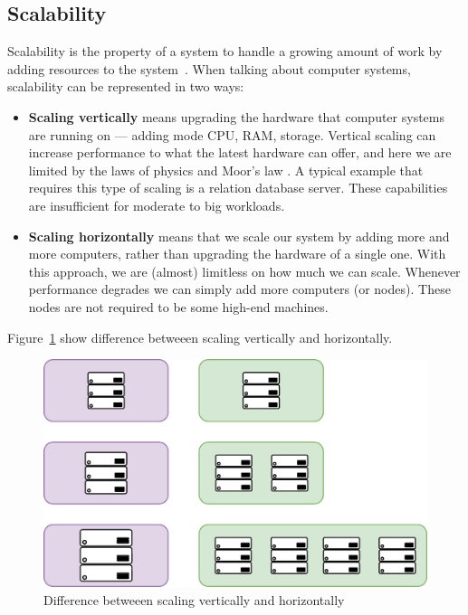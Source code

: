 \subsection{Scalability}\label{sec:scalability}
%
Scalability is the property of a system to handle a growing amount of work by adding resources to the system~\cite{Bondi00}. When talking about computer systems, scalability can be represented in two ways:

\begin{itemize}
	\item \textbf{Scaling vertically} means upgrading the hardware that computer systems are running on --- adding mode CPU, RAM, storage. Vertical scaling can increase performance to what the latest hardware can offer, and here we are limited by the laws of physics and Moor's law \cite{Gustafson2011}. A typical example that requires this type of scaling is a relation database server. These capabilities are insufficient for moderate to big workloads.
	\item \textbf{Scaling horizontally} means that we scale our system by adding more and more computers, rather than upgrading the hardware of a single one. With this approach, we are (almost) limitless on how much we can scale. Whenever performance degrades we can simply add more computers (or nodes). These nodes are not required to be some high-end machines.
\end{itemize}

\noindent
Figure~\ref{fig:fig23} show difference betweeen scaling vertically and horizontally.

\begin{figure}[H]
	\begin{center}
		\includegraphics[scale=0.80]{images/Figure23}
	\end{center}
	\vspace{-0.6cm}
	\caption{Difference betweeen scaling vertically and horizontally}
	\label{fig:fig23}
\end{figure}

